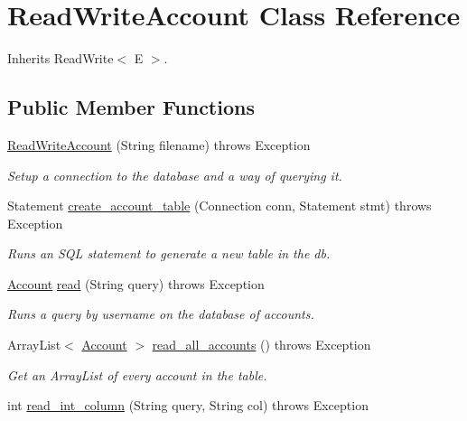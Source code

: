 \hypertarget{class_read_write_account}{}\section{Read\+Write\+Account Class Reference}
\label{class_read_write_account}


Inherits Read\+Write$<$ E $>$.

\subsection*{Public Member Functions}
\begin{DoxyCompactItemize}
\item 
\hyperlink{class_read_write_account_a3c89be0e9259ae04b7b88de6d791f2ff}{Read\+Write\+Account} (String filename)  throws Exception     
\begin{DoxyCompactList}\small\item\em Setup a connection to the database and a way of querying it. \end{DoxyCompactList}\item 
Statement \hyperlink{class_read_write_account_aec86c1bc4029bb3699c85dee12982de8}{create\+\_\+account\+\_\+table} (Connection conn, Statement stmt)  throws Exception     
\begin{DoxyCompactList}\small\item\em Runs an S\+QL statement to generate a new table in the db. \end{DoxyCompactList}\item 
\hyperlink{class_account}{Account} \hyperlink{class_read_write_account_adb0ddd0ce6641f10c1b9220c670552e9}{read} (String query)  throws Exception     
\begin{DoxyCompactList}\small\item\em Runs a query by username on the database of accounts. \end{DoxyCompactList}\item 
Array\+List$<$ \hyperlink{class_account}{Account} $>$ \hyperlink{class_read_write_account_af566baef11164e567122f337ce3dc2cc}{read\+\_\+all\+\_\+accounts} ()  throws Exception     
\begin{DoxyCompactList}\small\item\em Get an Array\+List of every account in the table. \end{DoxyCompactList}\item 
int \hyperlink{class_read_write_account_afdac5d7a98c49a6daa71564116d3c49f}{read\+\_\+int\+\_\+column} (String query, String col)  throws Exception     

\end{DoxyCompactItemize}
